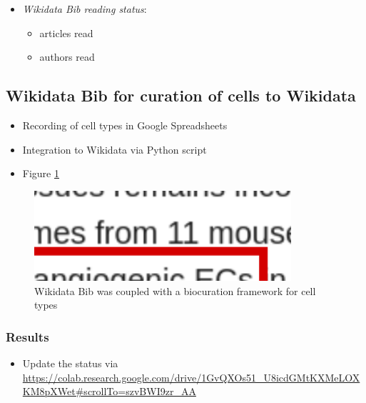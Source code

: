 \begin{itemize}
\tightlist
\item
  \emph{Wikidata Bib reading status}:

  \begin{itemize}
  \tightlist
  \item
    articles read
  \item
    authors read
  \end{itemize}
\end{itemize}

\hypertarget{wikidata-bib-for-curation-of-cells-to-wikidata}{%
\subsection{Wikidata Bib for curation of cells to Wikidata}\label{wikidata-bib-for-curation-of-cells-to-wikidata}}

\begin{itemize}
\item
  Recording of cell types in Google Spreadsheets
\item
  Integration to Wikidata via Python script
\item
  Figure \ref{fig:biocuration_of_cells}
\end{itemize}

\begin{figure}
\hypertarget{fig:biocuration_of_cells}{%
\centering
\includegraphics[width=0.85\textwidth,height=\textheight]{images/biocuration_of_cells.png}
\caption{Wikidata Bib was coupled with a biocuration framework for cell types}\label{fig:biocuration_of_cells}
}
\end{figure}

\hypertarget{results}{%
\subsubsection{Results}\label{results}}

\begin{itemize}
\tightlist
\item
  Update the status via \url{https://colab.research.google.com/drive/1GvQXOs51_U8icdGMtKXMeLOXKM8pXWet\#scrollTo=szvBWI9zr_AA}
\end{itemize}

